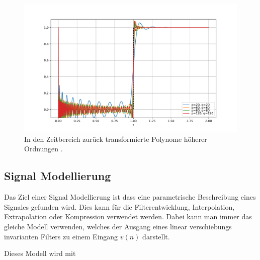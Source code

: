\begin{figure}
	\centering
	\includegraphics[width=1\linewidth]{./papers/pade/python/bilder/padehigh1.pdf}
	\caption{In den Zeitbereich zurück transformierte Polynome höherer Ordnungen \label{pade:totzeit}.}
\end{figure}



\subsection{Signal Modellierung
	\label{pade:subsection:SignalMod}}

Das Ziel einer Signal Modellierung ist dass eine parametrische Beschreibung eines Signales gefunden wird.
Dies kann für die Filterentwicklung, Interpolation, Extrapolation oder Kompression verwendet werden.
Dabei kann man immer das gleiche Modell verwenden, welches der Ausgang eines linear verschiebungs invarianten Filters zu einem Eingang $v(n)$ darstellt. 
\begin{figure}
	\centering
	\tikzset{>=latex}
\end{figure}
Dieses Modell wird mit

